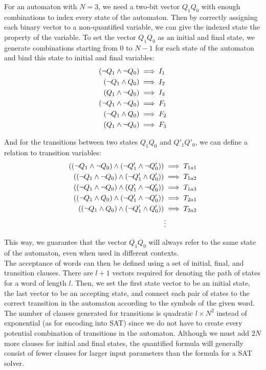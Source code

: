 For an automaton with $N=3$, we need a two-bit vector $Q_1Q_0$ with enough combinations to index every state of the automaton. Then by correctly assigning each binary vector to a non-quantified variable, we can give the indexed state the property of the variable. To set the vector $Q_1Q_0$ as an initial and final state, we generate combinations starting from $0$ to $N-1$ for each state of the automaton and bind this state to initial and final variables: 
\begin{align*}
    \centering
    (\neg Q_1 \land \neg Q_0) & \implies I_1 \\
    (\neg Q_1 \land Q_0) & \implies I_2 \\
    (Q_1 \land \neg Q_0) & \implies I_3 \\
    (\neg Q_1 \land \neg Q_0) & \implies F_1 \\
    (\neg Q_1 \land Q_0) & \implies F_2 \\
    (Q_1 \land \neg Q_0) & \implies F_3
\end{align*}

And for the transitions between two states $Q_1Q_0$ and $Q'_1Q'_0$, we can define a relation to transition variables:
\begin{align*}
    \centering
    ((\neg Q_1 \land \neg Q_0) \land (\neg Q'_1 \land \neg Q'_0)) & \implies T_{1a1} \\
    ((\neg Q_1 \land \neg Q_0) \land (\neg Q'_1 \land Q'_0)) & \implies T_{1a2} \\
    ((\neg Q_1 \land \neg Q_0) \land (Q'_1 \land \neg Q'_0)) & \implies T_{1a3} \\
    ((\neg Q_1 \land Q_0) \land (\neg Q'_1 \land \neg Q'_0)) & \implies T_{2a1} \\
    ((\neg Q_1 \land Q_0) \land (\neg Q'_1 \land Q'_0)) & \implies T_{2a2} \\
    & \vdots
\end{align*}

This way, we guarantee that the vector $Q_1Q_0$ will always refer to the same state of the automaton, even when used in different contexts. \\

The acceptance of words can then be defined using a set of initial, final, and transition clauses. There are $l+1$ vectors required for denoting the path of states for a word of length $l$. Then, we set the first state vector to be an initial state, the last vector to be an accepting state, and connect each pair of states to the correct transition in the automaton according to the symbols of the given word. The number of clauses generated for transitions is quadratic $l\times N^2$  instead of exponential (as for encoding into SAT) since we do not have to create every potential combination of transitions in the automaton. Although we must add $2N$ more clauses for initial and final states, the quantified formula will generally consist of fewer clauses for larger input parameters than the formula for a SAT solver. \\

